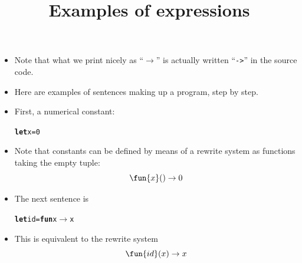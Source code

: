 \documentclass[wide]{slides}
\begin{document}
\begin{slide}
  \title{Examples of expressions}

  \begin{itemize}

    \item Note that what we print nicely as ``\(\rightarrow\)'' is
      actually written ``\texttt{->}'' in the source code.

    \item Here are examples of \OCaml sentences making up a program,
      step by step.

    \item First, a numerical constant:
\begin{alltt}
\textbf{let} x = 0
\end{alltt}

    \item Note that constants can be defined by means of a rewrite
      system as functions taking the empty tuple:
      \begin{equation*}
        \fun{x}() \rightarrow 0
      \end{equation*}

    \item The next sentence is
\begin{alltt}
\textbf{let} id = \textbf{fun} x \(\rightarrow\) x
\end{alltt}

    \item This is equivalent to the rewrite system
      \begin{equation*}
        \fun{id}(x) \rightarrow x
      \end{equation*}

  \end{itemize}

\end{slide}
\end{document}
